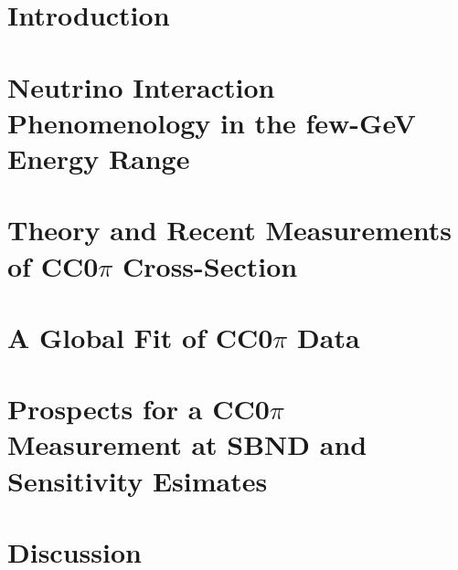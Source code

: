 \documentclass[11pt]{article}
\begin{document}
\section{Introduction}
\label{sec:intro}



\section{Neutrino Interaction Phenomenology in the few-GeV Energy Range}
\label{sec:NIP}



\section{Theory and Recent Measurements of CC0\( \pi \) Cross-Section}
\label{sec:XSec}



\section{A Global Fit of CC0\( \pi \) Data}
\label{sec:GF}



\section{Prospects for a CC0\( \pi \) Measurement at SBND and Sensitivity Esimates}
\label{sec:Prospects}




\section{Discussion}


\end{document}

